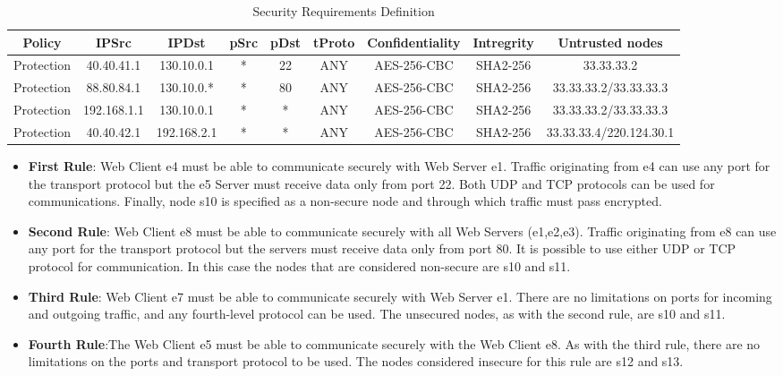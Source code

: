 \begin{table}[h]
    \centering
    \small
    \begin{tabular}{ccccccccc}
        \hline
         Policy & IPSrc & IPDst & pSrc & pDst & tProto & Confidentiality & Intregrity & Untrusted nodes\\
        \hline
        Protection & 40.40.41.1 & 130.10.0.1 & * & 22 & ANY & AES-256-CBC & SHA2-256 & 33.33.33.2 \\
        Protection & 88.80.84.1 & 130.10.0.* & * & 80 & ANY & AES-256-CBC & SHA2-256 & 33.33.33.2/33.33.33.3 \\
        Protection & 192.168.1.1 & 130.10.0.1 & * & * & ANY & AES-256-CBC & SHA2-256 & 33.33.33.2/33.33.33.3 \\
        Protection & 40.40.42.1 & 192.168.2.1 & * & * & ANY & AES-256-CBC & SHA2-256 & 33.33.33.4/220.124.30.1 \\
        \hline
    \end{tabular}
    \caption{Security Requirements Definition}
    \label{tab:tabella}
\end{table}
\begin{itemize}
    \item \textbf{First Rule}: Web Client e4 must be able to communicate securely with Web Server e1. Traffic originating from e4 can use any port for the transport protocol but the e5 Server must receive data only from port 22. Both UDP and TCP protocols can be used for communications. Finally, node s10 is specified as a non-secure node and through which traffic must pass encrypted.
    \item \textbf{Second Rule}: Web Client e8 must be able to communicate securely with all Web Servers (e1,e2,e3). Traffic originating from e8 can use any port for the transport protocol but the servers must receive data only from port 80. It is possible to use either UDP or TCP protocol for communication. In this case the nodes that are considered non-secure are s10 and s11.
    \item \textbf{Third Rule}: Web Client e7 must be able to communicate securely with Web Server e1. There are no limitations on ports for incoming and outgoing traffic, and any fourth-level protocol can be used. The unsecured nodes, as with the second rule, are s10 and s11. 
    \item \textbf{Fourth Rule}:The Web Client e5 must be able to communicate securely with the Web Client e8. As with the third rule, there are no limitations on the ports and transport protocol to be used. The nodes considered insecure for this rule are s12 and s13.
\end{itemize}

